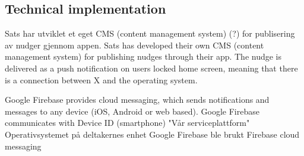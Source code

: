 \subsection{Technical implementation}
Sats har utviklet et eget CMS (content management system) (?) for publisering av nudger gjennom appen.
Sats has developed their own CMS (content management system) for publishing nudges through their app. The nudge is delivered as a push notification on users locked home screen, meaning that there is a connection between X and the operating system. 

Google Firebase provides cloud messaging, which sends notifications and messages to any device (iOS, Android or web based). 
Google Firebase communicates with Device ID (smartphone) 
"Vår serviceplattform"
Operativsystemet på deltakernes enhet 
Google Firebase ble brukt 
Firebase cloud messaging 



